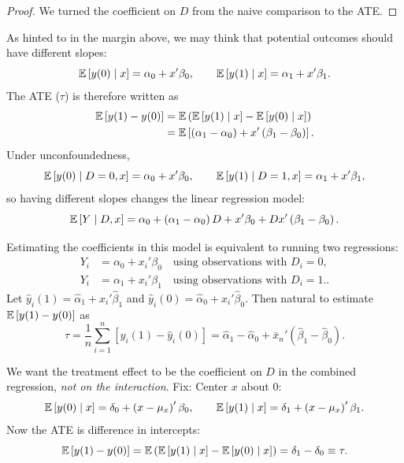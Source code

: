 \begin{proof}
	We turned the coefficient on $D$ from the naive comparison to the ATE.
\end{proof}

\begin{proposition}
	As hinted to in the margin above, we may think that potential outcomes should have different slopes:
	\[
		\mathbb{E}\left[y(0) \mid x\right] = \alpha_0 + x'\beta_0, \qquad
		\mathbb{E}\left[y(1) \mid x\right] = \alpha_1 + x'\beta_1
	.\]
	The ATE ($\tau$) is therefore written as
	\begin{align*}
		\mathbb{E}\left[y(1)-y(0)\right]
		&= \mathbb{E}\left(\mathbb{E}\left[y(1) \mid x\right] - \mathbb{E}\left[y(0) \mid x\right]\right) \\
		&= \mathbb{E}\left[\left(\alpha_1-\alpha_0\right) + x'\left(\beta_1-\beta_0\right)\right]
	.\end{align*}
	Under unconfoundedness,
	\[
		\mathbb{E}\left[y(0) \mid D=0, x\right] = \alpha_0 + x'\beta_0, \qquad
		\mathbb{E}\left[y(1) \mid D=1, x\right] = \alpha_1 + x'\beta_1
	,\]
	so having different slopes changes the linear regression model:
	\[
		\mathbb{E}\left[Y \mid D, x\right] = \alpha_0 + \left(\alpha_1-\alpha_0\right)D + x'\beta_0 + D x'\left(\beta_1-\beta_0\right)
	.\]

	Estimating the coefficients in this model is equivalent to running two regressions:
	\begin{align*}
		Y_i &= \alpha_0 + x_i'\beta_0 \quad \text{using observations with $D_i=0$,} \\
		Y_i &= \alpha_1 + x_i'\beta_1 \quad \text{using observations with $D_i=1$.}
	.\end{align*}
	Let $\hat{y}_i(1) = \hat{\alpha}_1 + x_i'\hat{\beta}_1$ and $\hat{y}_i(0) = \hat{\alpha}_0 + x_i'\hat{\beta}_0$. Then natural to estimate $\mathbb{E}\left[y(1)-y(0)\right]$ as
	\[
		\hat{\tau} = \frac{1}{n}\sum\limits_{i=1}^{n}\left[\hat{y}_i(1)-\hat{y}_i(0)\right]
		= \hat{\alpha}_1 - \hat{\alpha}_0 + \bar{x}_n'\left(\hat{\beta}_1-\hat{\beta}_0\right)
	.\]

	We want the treatment effect to be the coefficient on $D$ in the combined regression, \emph{not on the interaction}. Fix: Center $x$ about $0$:
	\[
		\mathbb{E}\left[y(0) \mid x\right] = \delta_0 + \left(x-\mu_x\right)'\beta_0, \qquad
		\mathbb{E}\left[y(1) \mid x\right] = \delta_1 + \left(x-\mu_x\right)'\beta_1
	.\]
	Now the ATE is difference in intercepts:
	\[
		\mathbb{E}\left[y(1)-y(0)\right] = \mathbb{E}\left(\mathbb{E}\left[y(1) \mid x\right]-\mathbb{E}\left[y(0) \mid x\right]\right) = \delta_1-\delta_0 \equiv \tau
	.\]


\end{proposition}
